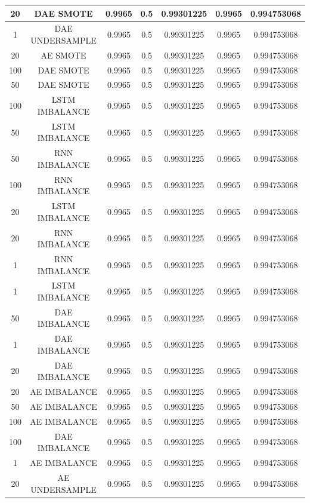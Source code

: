 \begin{longtable}{|c|c|c|c|c|c|c|}
  	20 & DAE SMOTE & 0.9965 & 0.5 & 0.99301225 & 0.9965 & 0.994753068\\ \hline
  	1 & DAE UNDERSAMPLE & 0.9965 & 0.5 & 0.99301225 & 0.9965 & 0.994753068\\ \hline
  	20 & AE SMOTE & 0.9965 & 0.5 & 0.99301225 & 0.9965 & 0.994753068\\ \hline
  	100 & DAE SMOTE & 0.9965 & 0.5 & 0.99301225 & 0.9965 & 0.994753068\\ \hline
  	50 & DAE SMOTE & 0.9965 & 0.5 & 0.99301225 & 0.9965 & 0.994753068\\ \hline
  	100 & LSTM IMBALANCE & 0.9965 & 0.5 & 0.99301225 & 0.9965 & 0.994753068\\ \hline
  	50 & LSTM IMBALANCE & 0.9965 & 0.5 & 0.99301225 & 0.9965 & 0.994753068\\ \hline
  	50 & RNN IMBALANCE & 0.9965 & 0.5 & 0.99301225 & 0.9965 & 0.994753068\\ \hline
  	100 & RNN IMBALANCE & 0.9965 & 0.5 & 0.99301225 & 0.9965 & 0.994753068\\ \hline
  	20 & LSTM IMBALANCE & 0.9965 & 0.5 & 0.99301225 & 0.9965 & 0.994753068\\ \hline
  	20 & RNN IMBALANCE & 0.9965 & 0.5 & 0.99301225 & 0.9965 & 0.994753068\\ \hline
  	1 & RNN IMBALANCE & 0.9965 & 0.5 & 0.99301225 & 0.9965 & 0.994753068\\ \hline
  	1 & LSTM IMBALANCE & 0.9965 & 0.5 & 0.99301225 & 0.9965 & 0.994753068\\ \hline
  	50 & DAE IMBALANCE & 0.9965 & 0.5 & 0.99301225 & 0.9965 & 0.994753068\\ \hline
  	1 & DAE IMBALANCE & 0.9965 & 0.5 & 0.99301225 & 0.9965 & 0.994753068\\ \hline
  	20 & DAE IMBALANCE & 0.9965 & 0.5 & 0.99301225 & 0.9965 & 0.994753068\\ \hline
  	20 & AE IMBALANCE & 0.9965 & 0.5 & 0.99301225 & 0.9965 & 0.994753068\\ \hline
  	50 & AE IMBALANCE & 0.9965 & 0.5 & 0.99301225 & 0.9965 & 0.994753068\\ \hline
  	100 & AE IMBALANCE & 0.9965 & 0.5 & 0.99301225 & 0.9965 & 0.994753068\\ \hline
  	100 & DAE IMBALANCE & 0.9965 & 0.5 & 0.99301225 & 0.9965 & 0.994753068\\ \hline
  	1 & AE IMBALANCE & 0.9965 & 0.5 & 0.99301225 & 0.9965 & 0.994753068\\ \hline
  	20 & AE UNDERSAMPLE & 0.9965 & 0.5 & 0.99301225 & 0.9965 & 0.994753068\\ \hline

\end{longtable}
